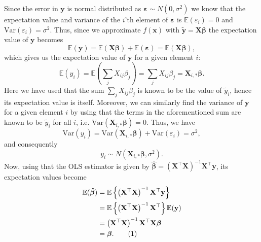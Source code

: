 \documentclass[aps,pra,english,notitlepage,reprint,nofootinbib]{revtex4-1}  %
\newcommand\numberthis{\addtocounter{equation}{1}\tag{\theequation}}
\begin{document}
Since the error in $\mathbf{y}$ is normal distributed as $\boldsymbol{\varepsilon}\sim N(0,\sigma^2)$ we know that the expectation value and variance of the $i$'th element of $\boldsymbol{\varepsilon}$ is $\mathbb{E}(\varepsilon_i)=0$ and $\textrm{Var}(\varepsilon_i)=\sigma^2$. Thus, since we approximate $f(\mathbf{x})$ with $\mathbf{\tilde{y}}=\mathbf{X}\boldsymbol{\beta}$ the expectation value of $\mathbf{y}$ becomes 
\begin{equation}
\mathbb{E}(\mathbf{y})=\mathbb{E}(\mathbf{X}\boldsymbol{\beta}) + \mathbb{E}(\boldsymbol{\varepsilon}) = \mathbb{E}(\mathbf{X}\boldsymbol{\beta}),
\end{equation}
which gives us the expectation value of $\mathbf{y}$ for a given element $i$:
\begin{equation}
\mathbb{E}(y_i) = \mathbb{E}\left(\sum_jX_{ij}\beta_j\right) = \sum_jX_{ij}\beta_j = \mathbf{X}_{i,*}\boldsymbol{\beta}.
\end{equation}
Here we have used that the sum $\sum_jX_{ij}\beta_j$ is known to be the value of $\tilde{y}_i$, hence its expectation value is itself. Moreover, we can similarly find the variance of $\mathbf{y}$ for a given element $i$ by using that the terms in the aforementioned sum are known to be $\tilde{y}_i$ for all $i$, i.e. $\textrm{Var}(\mathbf{X}_{i,*}\boldsymbol{\beta})=0$. Thus, we have
\begin{equation}
\textrm{Var}(y_i) = \textrm{Var}(\mathbf{X}_{i,*}\boldsymbol{\beta}) + \textrm{Var}(\varepsilon_i) = \sigma^2,
\end{equation}
and consequently
\begin{equation}
  y_i\sim N(\mathbf{X}_{i,*}\boldsymbol{\beta},\sigma^2).
\end{equation}
Now, using that the OLS estimator is given by $\boldsymbol{\hat{\beta}}=\left(\mathbf{X}^\top\mathbf{X}\right)^{-1}\mathbf{X}^\top\mathbf{y}$, its expectation values become
\begin{align*}
  \mathbb{E}(\boldsymbol{\hat{\beta}})&=\mathbb{E}\left\{ \left(\mathbf{X}^\top\mathbf{X}\right)^{-1}\mathbf{X}^\top\mathbf{y} \right\} \\
  &= \mathbb{E}\left\{\left(\mathbf{X}^\top\mathbf{X}\right)^{-1}\mathbf{X}^\top\right\} \mathbb{E}(\mathbf{y}) \\
  &= \left(\mathbf{X}^\top\mathbf{X}\right)^{-1}\mathbf{X}^\top\mathbf{X}\boldsymbol{\beta} \\
  &= \boldsymbol{\beta}. \numberthis \label{appeq:expect beta OLS}
\end{align*}
\end{document}

